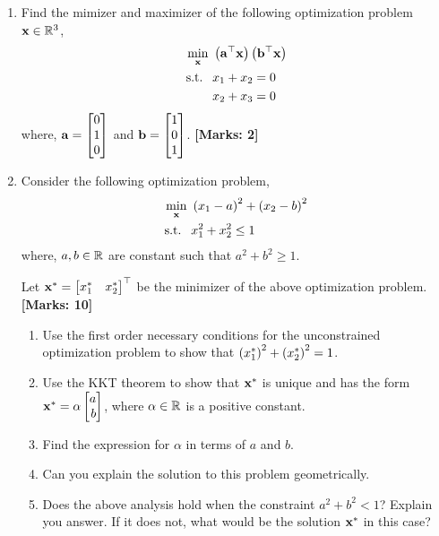 \documentclass[12pt]{article}
\def\mf{\ensuremath\mathbf}
\def\mb{\ensuremath\mathbb}
\def\lp{\ensuremath\left(}
\def\rp{\ensuremath\right)}
\def\bmx{\ensuremath\begin{bmatrix*}[r]}
\def\emx{\ensuremath\end{bmatrix*}}
\newcommand{\ct}[1]{\lp #1\rp}
\begin{document}
\begin{enumerate}
    \item Find the mimizer and maximizer of the following optimization problem $\mf{x} \in \mb{R}^3$,
    \[  \begin{split}
        \min_{\mf{x}} &\,\, \ct{\mf{a}^\top \mf{x}}\ct{\mf{b}^\top \mf{x}} \\
        \text{s.t. } &\,\, x_1 + x_2 = 0\\
                    &\,\, x_2 + x_3 = 0
        \end{split} \]
    where, $\mf{a} = \bmx 0 \\ 1 \\ 0\emx$ and $\mf{b} = \bmx 1 \\ 0 \\ 1\emx$. \textbf{[Marks: 2]}
        
    \item Consider the following optimization problem,
    \[  \begin{split}
        \min_{\mf{x}} &\,\, \ct{x_1 - a}^2 + \ct{x_2 - b}^2 \\
        \text{s.t. } &\,\, x_1^2 + x_2^2 \leq 1
        \end{split} \]
    where, $a, b \in \mb{R}$ are constant such that $a^2 + b^2 \geq 1$.
    
    Let $\mf{x}^* = \bmx x_1^* & x_2^*\emx^\top$ be the minimizer of the above optimization problem.  \textbf{[Marks: 10]}
    \begin{enumerate}
        \item Use the first order necessary conditions for the unconstrained optimization problem to show that $\ct{x_1^*}^2 + \ct{x_2^*}^2 = 1$.
        \item Use the KKT theorem to show that $\mf{x}^*$ is unique and has the form $\mf{x}^* = \alpha\bmx a \\ b\emx$, where $\alpha \in \mb{R}$ is a positive constant.
        \item Find the expression for $\alpha$ in terms of $a$ and $b$.
        \item Can you explain the solution to this problem geometrically.
        \item Does the above analysis hold when the constraint $a^2 + b^2 < 1$? Explain you answer. If it does not, what would be the solution $\mf{x}^*$ in this case?
    \end{enumerate}
    

\end{enumerate}
\end{document}
